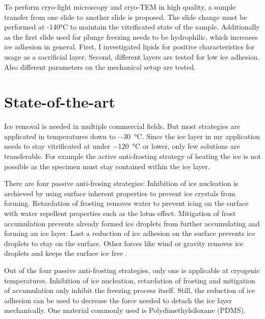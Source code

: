 To perform cryo-light microscopy and cryo-TEM in high quality, a sample transfer from one slide to another slide is proposed. The slide change must be performed at -140°C to maintain the vitrificated state of the sample. Additionally as the first slide used for plunge freezing needs to be hydrophilic, which increases ice adhesion in general. First, I investigated lipids for positive characteristics for usage as a sacrificial layer. Second, different layers are tested for low ice adhesion. Also different parameters on the mechanical setup are tested.

\section{State-of-the-art}

Ice removal is needed in multiple commercial fields. But most strategies are applicated in temperatures down to \SI{-30}{\degreeCelsius}. Since the ice layer in my application needs to stay vitrificated at under \SI{-120}{\degreeCelsius} or lower, only few solutions are transferable. For example the active anti-frosting strategy of heating the ice is not possible as the specimen must stay contained within the ice layer.


There are four passive anti-frosing strategies: Inhibition of ice nucleation is archieved by using surface inherent properties to prevent ice crystals from forming. Retardation of frosting removes water to prevent icing on the surface with water repellent properties such as the lotus effect. Mitigation of frost accumulation prevents already formed ice droplets from further accumulating and forming an ice layer. Last a reduction of ice adhesion on the surface prevents ice droplets to stay on the surface. Other forces like wind or gravity removes ice droplets and keeps the surface ice free \cite{Yang.2021}. 

Out of the four passive anti-frosting strategies, only one is applicable at cryogenic temperatures. Inhibition of ice nucleation, retardation of frosting and mitigation of accumulation only inhibit the freezing process itself. Still, the reduction of ice adhesion can be used to decrease the force needed to detach the ice layer mechanically. One material commonly used is Polydimethylsiloxane (PDMS).

